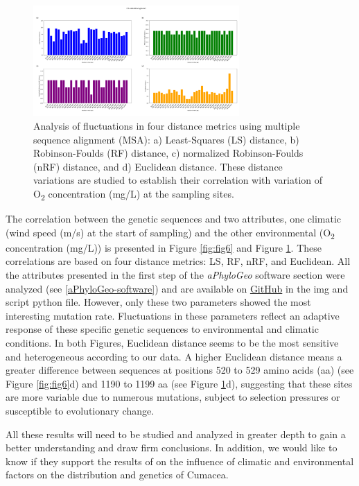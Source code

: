 \begin{figure}[]
    \centering
    \includegraphics[width=0.7\textwidth]{figure6.png}
    \caption{Analysis of fluctuations in four distance metrics using multiple sequence alignment (MSA): a) Least-Squares (LS) distance, b) Robinson-Foulds (RF) distance, c) normalized Robinson-Foulds (nRF) distance, and d) Euclidean distance. These distance variations are studied to establish their correlation with variation of O\textsubscript{2} concentration (mg/L) at the sampling sites. \label{fig:fig7}}
\end{figure}

The correlation between the genetic sequences and two attributes, one climatic (wind speed (m/s) at the start of sampling) and the other environmental (O\textsubscript{2} concentration (mg/L)) is presented in Figure \ref{fig:fig6} and Figure \ref{fig:fig7}. These correlations are based on four distance metrics: LS, RF, nRF, and Euclidean. All the attributes presented in the first step of the \textit{aPhyloGeo} software section were analyzed (see \autoref{aPhyloGeo-software}) and are available on \href{https://github.com/tahiri-lab/Cumacea_aPhyloGeo}{GitHub} in the img and script python file. However, only these two parameters showed the most interesting mutation rate. Fluctuations in these parameters reflect an adaptive response of these specific genetic sequences to environmental and climatic conditions. In both Figures, Euclidean distance seems to be the most sensitive and heterogeneous according to our data. A higher Euclidean distance means a greater difference between sequences at positions 520 to 529 amino acids (aa) (see Figure \ref{fig:fig6}d) and 1190 to 1199 aa (see Figure \ref{fig:fig7}d), suggesting that these sites are more variable due to numerous mutations, subject to selection pressures or susceptible to evolutionary change. 

All these results will need to be studied and analyzed in greater depth to gain a better understanding and draw firm conclusions. In addition, we would like to know if they support the results of \citep{uhlir_adding_2021} on the influence of climatic and environmental factors on the distribution and genetics of Cumacea.

